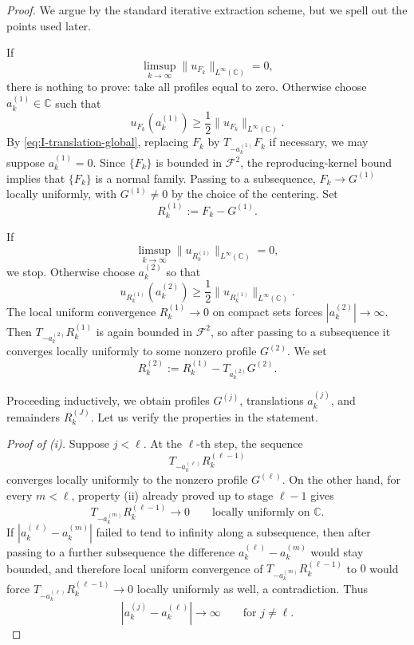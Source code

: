 \documentclass[a4paper,11pt,reqno]{amsart}
\numberwithin{equation}{section}
\theoremstyle{plain} %
\theoremstyle{definition} %
\theoremstyle{remark}
\newcommand{\C}{\mathbb{C}}
\begin{document}
\begin{proof}
We argue by the standard iterative extraction scheme, but we spell out the points
used later.

If
\[
\limsup_{k\to\infty}\|u_{F_k}\|_{L^\infty(\C)}=0,
\]
there is nothing to prove: take all profiles equal to zero. Otherwise choose
\(a_k^{(1)}\in \C\) such that
\[
u_{F_k}(a_k^{(1)})\ge \frac12\|u_{F_k}\|_{L^\infty(\C)}.
\]
By \eqref{eq:I-translation-global}, replacing \(F_k\) by \(T_{-a_k^{(1)}}F_k\)
if necessary, we may suppose \(a_k^{(1)}=0\). Since \(\{F_k\}\) is bounded in
\(\mathcal F^2\), the reproducing-kernel bound implies that \(\{F_k\}\) is a
normal family. Passing to a subsequence, \(F_k\to G^{(1)}\) locally uniformly,
with \(G^{(1)}\neq 0\) by the choice of the centering. Set
\[
R_k^{(1)}:=F_k-G^{(1)}.
\]

If
\[
\limsup_{k\to\infty}\|u_{R_k^{(1)}}\|_{L^\infty(\C)}=0,
\]
we stop. Otherwise choose \(a_k^{(2)}\) so that
\[
u_{R_k^{(1)}}(a_k^{(2)})\ge \frac12\|u_{R_k^{(1)}}\|_{L^\infty(\C)}.
\]
The local uniform convergence \(R_k^{(1)}\to 0\) on compact sets forces
\(|a_k^{(2)}|\to\infty\). Then \(T_{-a_k^{(2)}}R_k^{(1)}\) is again bounded in
\(\mathcal F^2\), so after passing to a subsequence it converges locally
uniformly to some nonzero profile \(G^{(2)}\). We set
\[
R_k^{(2)}:=R_k^{(1)}-T_{a_k^{(2)}}G^{(2)}.
\]

Proceeding inductively, we obtain profiles \(G^{(j)}\), translations
\(a_k^{(j)}\), and remainders \(R_k^{(J)}\). Let us verify the properties in the
statement.

\medskip
\noindent\emph{Proof of (i).}
Suppose \(j<\ell\). At the \(\ell\)-th step, the sequence
\[
T_{-a_k^{(\ell)}}R_k^{(\ell-1)}
\]
converges locally uniformly to the nonzero profile \(G^{(\ell)}\). On the other
hand, for every \(m<\ell\), property (ii) already proved up to stage \(\ell-1\)
gives
\[
T_{-a_k^{(m)}}R_k^{(\ell-1)}\to 0
\qquad\text{locally uniformly on }\C.
\]
If \(|a_k^{(\ell)}-a_k^{(m)}|\) failed to tend to infinity along a subsequence,
then after passing to a further subsequence the difference
\(a_k^{(\ell)}-a_k^{(m)}\) would stay bounded, and therefore local uniform
convergence of \(T_{-a_k^{(m)}}R_k^{(\ell-1)}\) to \(0\) would force
\(T_{-a_k^{(\ell)}}R_k^{(\ell-1)}\to 0\) locally uniformly as well, a
contradiction. Thus
\[
|a_k^{(j)}-a_k^{(\ell)}|\to\infty
\qquad\text{for }j\neq \ell.
\]


\end{proof}
\end{document}
